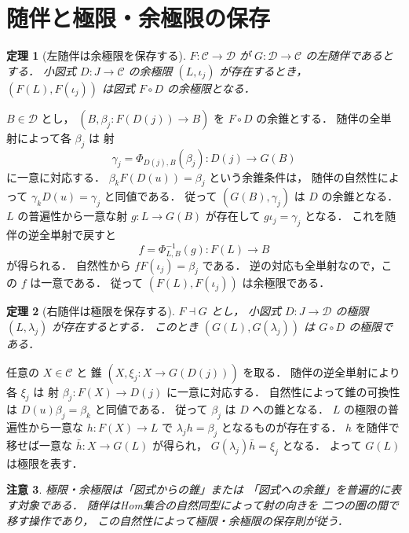 \documentclass[a5paper,10pt,onecolumn]{jsarticle}
\makeatletter
\theoremstyle{mathnotetheorem}
\newtheorem{theorem}{定理}[section]
\newtheorem{remark}[theorem]{注意}
\renewcommand{\proofname}{証明}
\renewenvironment{proof}[1][\proofname]{%
  \par\pushQED{\qed}\normalfont\topsep4\p@\@plus2\p@\relax
  \trivlist\item[\hskip\labelsep\bfseries #1]\ignorespaces
}{\popQED\endtrivlist\@endpefalse}
\makeatother
\begin{document}
\section{随伴と極限・余極限の保存}

\begin{theorem}[左随伴は余極限を保存する]
\label{thm:left-preserves}
$F:\mathcal C\to\mathcal D$ が
$G:\mathcal D\to\mathcal C$ の左随伴であるとする．
小図式 $D:J\to\mathcal C$ の余極限
$(L,\iota_j)$ が存在するとき，
$(F(L),F(\iota_j))$ は図式 $F\circ D$ の余極限となる．
\end{theorem}
\begin{proof}
$B\in\mathcal D$ とし，
$(B,\beta_j:F(D(j))\to B)$ を
$F\circ D$ の余錐とする．
随伴の全単射によって各 $\beta_j$ は
射
\[
 \gamma_j=\Phi_{D(j),B}(\beta_j):
 D(j)\longrightarrow G(B)
\]
に一意に対応する．
$\beta_kF(D(u))=\beta_j$ という余錐条件は，
随伴の自然性によって
$\gamma_kD(u)=\gamma_j$ と同値である．
従って $(G(B),\gamma_j)$ は $D$ の余錐となる．
$L$ の普遍性から一意な射 $g:L\to G(B)$ が存在して
$g\iota_j=\gamma_j$ となる．
これを随伴の逆全単射で戻すと
\[
 f=\Phi^{-1}_{L,B}(g):F(L)\longrightarrow B
\]
が得られる．
自然性から
$fF(\iota_j)=\beta_j$ である．
逆の対応も全単射なので，この $f$ は一意である．
従って $(F(L),F(\iota_j))$ は余極限である．
\end{proof}

\begin{theorem}[右随伴は極限を保存する]
\label{thm:right-preserves}
$F\dashv G$ とし，
小図式 $D:J\to\mathcal D$ の極限
$(L,\lambda_j)$ が存在するとする．
このとき
$(G(L),G(\lambda_j))$ は
$G\circ D$ の極限である．
\end{theorem}
\begin{proof}
任意の $X\in\mathcal C$ と
錐 $(X,\xi_j:X\to G(D(j)))$ を取る．
随伴の逆全単射により各 $\xi_j$ は
射
$\beta_j:F(X)\to D(j)$ に一意に対応する．
自然性によって錐の可換性は
$D(u)\beta_j=\beta_k$ と同値である．
従って $\beta_j$ は $D$ への錐となる．
$L$ の極限の普遍性から一意な
$h:F(X)\to L$ で
$\lambda_jh=\beta_j$ となるものが存在する．
$h$ を随伴で移せば一意な
$\bar h:X\to G(L)$ が得られ，
$G(\lambda_j)\bar h=\xi_j$ となる．
よって $G(L)$ は極限を表す．
\end{proof}

\begin{remark}
極限・余極限は「図式からの錐」または
「図式への余錐」を普遍的に表す対象である．
随伴はHom集合の自然同型によって射の向きを
二つの圏の間で移す操作であり，
この自然性によって極限・余極限の保存則が従う．
\end{remark}
\end{document}
